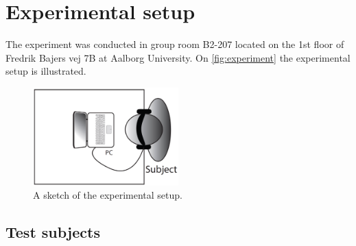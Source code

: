 \section*{Experimental setup}
%
The experiment was conducted in group room B2-207 located on the 1st floor of Fredrik Bajers vej 7B at Aalborg University. On \autoref{fig:experiment} the experimental setup is illustrated. 
%
\begin{figure}[H]
\centering
\includegraphics[width = 0.5\textwidth]{Figure/experiment.png} 
\caption{A sketch of the experimental setup.}
\label{fig:experiment}
\end{figure}
%

\subsection*{Test subjects}
%
